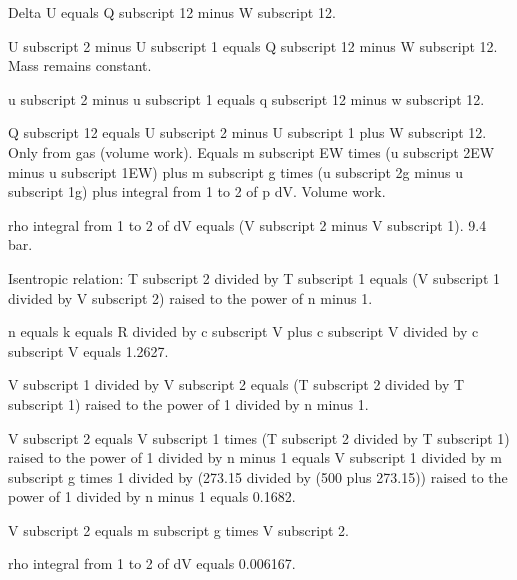 Delta U equals Q subscript 12 minus W subscript 12.

U subscript 2 minus U subscript 1 equals Q subscript 12 minus W subscript 12.  
Mass remains constant.

u subscript 2 minus u subscript 1 equals q subscript 12 minus w subscript 12.

Q subscript 12 equals U subscript 2 minus U subscript 1 plus W subscript 12.  
Only from gas (volume work).  
Equals m subscript EW times (u subscript 2EW minus u subscript 1EW) plus m subscript g times (u subscript 2g minus u subscript 1g) plus integral from 1 to 2 of p dV.  
Volume work.

rho integral from 1 to 2 of dV equals (V subscript 2 minus V subscript 1).  
9.4 bar.

Isentropic relation:  
T subscript 2 divided by T subscript 1 equals (V subscript 1 divided by V subscript 2) raised to the power of n minus 1.

n equals k equals R divided by c subscript V plus c subscript V divided by c subscript V equals 1.2627.

V subscript 1 divided by V subscript 2 equals (T subscript 2 divided by T subscript 1) raised to the power of 1 divided by n minus 1.

V subscript 2 equals V subscript 1 times (T subscript 2 divided by T subscript 1) raised to the power of 1 divided by n minus 1 equals V subscript 1 divided by m subscript g times 1 divided by (273.15 divided by (500 plus 273.15)) raised to the power of 1 divided by n minus 1 equals 0.1682.

V subscript 2 equals m subscript g times V subscript 2.

rho integral from 1 to 2 of dV equals 0.006167.
